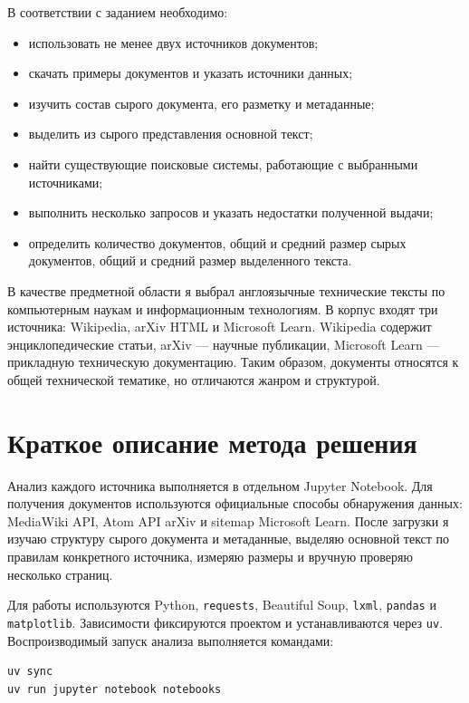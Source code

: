 \documentclass[pdf,unicode,12pt,a4paper,oneside,fleqn]{article}
\begin{document}
В соответствии с заданием необходимо:

\begin{itemize}
    \item использовать не менее двух источников документов;
    \item скачать примеры документов и указать источники данных;
    \item изучить состав сырого документа, его разметку и метаданные;
    \item выделить из сырого представления основной текст;
    \item найти существующие поисковые системы, работающие с выбранными
    источниками;
    \item выполнить несколько запросов и указать недостатки полученной выдачи;
    \item определить количество документов, общий и средний размер сырых
    документов, общий и средний размер выделенного текста.
\end{itemize}

В качестве предметной области я выбрал англоязычные технические тексты по
компьютерным наукам и информационным технологиям. В корпус входят три источника:
Wikipedia, arXiv HTML и Microsoft Learn. Wikipedia содержит энциклопедические
статьи, arXiv --- научные публикации, Microsoft Learn --- прикладную техническую
документацию. Таким образом, документы относятся к общей технической тематике,
но отличаются жанром и структурой.

\section{Краткое описание метода решения}

Анализ каждого источника выполняется в отдельном Jupyter Notebook. Для получения
документов используются официальные способы обнаружения данных: MediaWiki API,
Atom API arXiv и sitemap Microsoft Learn. После загрузки я изучаю структуру
сырого документа и метаданные, выделяю основной текст по правилам конкретного
источника, измеряю размеры и вручную проверяю несколько страниц.

Для работы используются Python, \texttt{requests}, Beautiful Soup,
\texttt{lxml}, \texttt{pandas} и \texttt{matplotlib}. Зависимости фиксируются
проектом и устанавливаются через \texttt{uv}. Воспроизводимый запуск анализа
выполняется командами:

\begin{lstlisting}[language=bash]
uv sync
uv run jupyter notebook notebooks
\end{lstlisting}
\end{document}
